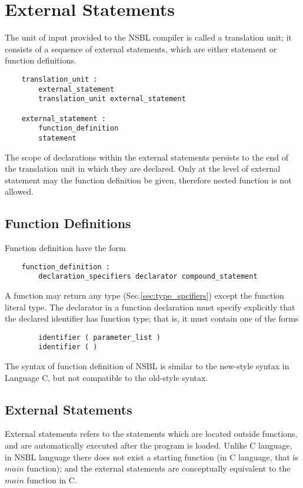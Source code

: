 \documentclass[letterpaper,12pt]{article}
\begin{document}
\section{External Statements}
The unit of input provided to the NSBL compiler is called a translation unit; it consists of a sequence of external statements, which are either statement or function definitions.
\begin{lstlisting}
	translation_unit :
		external_statement
		translation_unit external_statement

	external_statement :
		function_definition
		statement
\end{lstlisting}
The scope of declarations within the external statements persists to the end of the translation unit in which they are declared. Only at the level of external statement may the function definition be given, therefore nested function is not allowed.

\subsection{Function Definitions}
Function definition have the form
\begin{lstlisting}
	function_definition :
		declaration_specifiers declarator compound_statement
\end{lstlisting}
A function may return any type (Sec.\ref{sec:type_spcifiers}) except the function literal type. The declarator in a function declaration must specify explicitly that the declared identifier has function type; that is, it must contain one of the forms
\begin{lstlisting}
		identifier ( parameter_list )
		identifier ( )
\end{lstlisting}
The syntax of function definition of NSBL is similar to the new-style syntax in Language C, but not compatible to the old-style syntax.

\subsection{External Statements}\label{sec:extStat}
External statements refers to the statements which are located outside functions, and are automatically executed after the program is loaded. Unlike C language, in NSBL language there does not exist a starting function (in C language, that is $main$ function); and the external statements are conceptually equivalent to the $main$ function in C. \newline 
\end{document}
